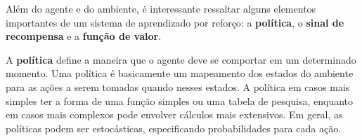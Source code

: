

Além do agente e do ambiente, é interessante ressaltar alguns elementos importantes de um sistema de aprendizado por reforço: a \textbf{política}, o \textbf{sinal de recompensa} e a \textbf{função de valor}.

A \textbf{política} define a maneira que o agente deve se comportar em um determinado momento. 
Uma política é basicamente um mapeamento dos estados do ambiente para as ações a serem tomadas quando nesses estados. 
A política em casos mais simples ter a forma de uma função simples ou uma tabela de pesquisa, enquanto em casos mais complexos pode envolver cálculos mais extensivos. 
Em geral, as políticas podem ser estocásticas, especificando probabilidades para cada ação.

